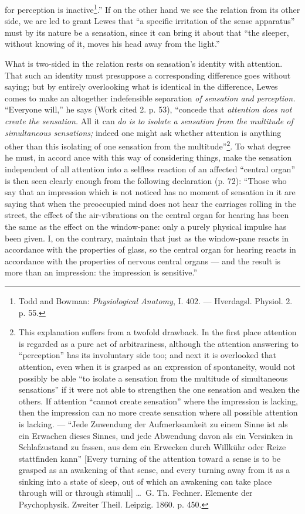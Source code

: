 \documentclass[12pt,a4paper]{book}
\begin{document}
\setcounter{footnote}{0}
for perception is inactive\footnote{Todd and Bowman: \textit{Physiological Anatomy},
I. 402. --- Hverdagsl. Physiol. 2. p. 55.}.'' If on the other hand we see the relation
from its other side, we are led to grant Lewes that ``a specific irritation of the
sense apparatus'' must by its nature be a sensation, since it can bring it about that
``the sleeper, without knowing of it, moves his head away from the light.''

What is two-sided in the relation rests on sensation's identity with attention. That
such an identity must presuppose a corresponding difference goes without saying; but
by entirely overlooking what is identical in the difference, Lewes comes to make an
altogether indefensible separation \emph{of sensation and perception.} ``Everyone
will,'' he says (Work cited 2. p. 53), ``concede that \emph{attention does not create
the sensation.} All it can \emph{do is to isolate a sensation from the multitude of
simultaneous sensations;} indeed one might ask whether attention is anything other
than this isolating of one sensation from the multitude''\footnote{This explanation
suffers from a twofold drawback. In the first place attention is regarded as a pure
act of arbitrariness, although the attention answering to ``perception'' has its
involuntary side too; and next it is overlooked that attention, even when it is
grasped as an expression of spontaneity, would not possibly be able ``to isolate a
sensation from the multitude of simultaneous sensations'' if it were not able to
strengthen the one sensation and weaken the others. If attention ``cannot create
sensation'' where the impression is lacking, then the impression can no more create
sensation where all possible attention is lacking. --- ``Jede Zuwendung der
Aufmerksamkeit zu einem Sinne ist als ein Erwachen dieses Sinnes, und jede Abwendung
davon als ein Versinken in Schlafzustand zu fassen, aus dem ein Erwecken durch
Willkühr oder Reize stattfinden kann'' [Every turning of the attention toward a sense
is to be grasped as an awakening of that sense, and every turning away from it as a
sinking into a state of sleep, out of which an awakening can take place through will
or through stimuli] \dots\ G. Th. Fechner. Elemente der Psychophysik. Zweiter Theil.
Leipzig. 1860. p. 450.}. To what degree he must, in accord%
ance with this way of considering things, make the sensation independent of all
attention into a selfless reaction of an affected ``central organ'' is then seen
clearly enough from the following declaration (p. 72): ``Those who say that an
impression which is not noticed has no moment of sensation in it are saying that when
the preoccupied mind does not hear the carriages rolling in the street, the effect of
the air-vibrations on the central organ for hearing has been the same as the effect on
the window-pane: only a purely physical impulse has been given. I, on the contrary,
maintain that just as the window-pane reacts in accordance with the properties of
glass, so the central organ for hearing reacts in accordance with the properties of
nervous central organs --- and the result is more than an impression: the impression is
sensitive.''
\end{document}

